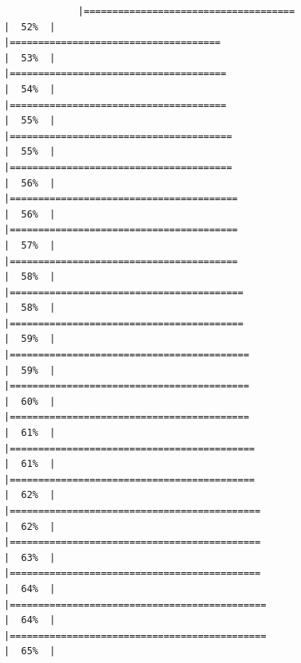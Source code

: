 \documentclass[
]{article}
\begin{document}
\begin{verbatim}
             |=====================================                                 |  52%  |                                                                              |=====================================                                 |  53%  |                                                                              |======================================                                |  54%  |                                                                              |======================================                                |  55%  |                                                                              |=======================================                               |  55%  |                                                                              |=======================================                               |  56%  |                                                                              |========================================                              |  56%  |                                                                              |========================================                              |  57%  |                                                                              |========================================                              |  58%  |                                                                              |=========================================                             |  58%  |                                                                              |=========================================                             |  59%  |                                                                              |==========================================                            |  59%  |                                                                              |==========================================                            |  60%  |                                                                              |==========================================                            |  61%  |                                                                              |===========================================                           |  61%  |                                                                              |===========================================                           |  62%  |                                                                              |============================================                          |  62%  |                                                                              |============================================                          |  63%  |                                                                              |============================================                          |  64%  |                                                                              |=============================================                         |  64%  |                                                                              |=============================================                         |  65%  |                                                                  
\end{verbatim}
\end{document}
